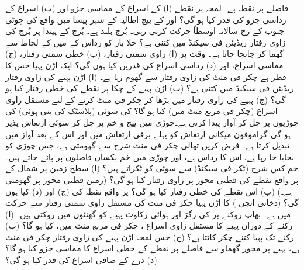  فاصلے پر  نقطہ ہے۔ لمحہ  پر  نقطے  (ا) کے اسراع کے مماسی جزو  اور (ب) اسراع کے رداسی جزو کی قدر کیا ہو گی؟
 اور  کے بیچ  اطالیہ   کے شہر  پیسا  میں واقع   کی چوٹی    جنوب کے رخ سالانہ  اوسطاً    حرکت کرتی رہی۔ بُرج  بلند ہے۔ بُرج کے پیندا پر  بُرج کی زاوی رفتار ریڈیئن فی سیکنڈ میں  کتنی  ہے؟ 
خلا باز  کو   رداس کے   میں  کے لحاظ سے گھما کر  جانچا جاتا ہے۔ وقت  پر (ا) زاوی سمتی رفتار، (ب) خطی سمتی رفتار، (ج) مماسی اسراع، اور (د) رداسی اسراع کی قدریں کیا ہوں گی؟
ایک اڑن پہیا جس کا قطر  ہے  چکر فی منٹ کی زاوی رفتار سے گھوم رہا ہے۔ (ا)  اڑن پہیے کی زاوی رفتار ریڈیئن فی سیکنڈ میں کتنی ہے؟ (ب) اڑن پہیے کے چکا پر نقطے کی خطی رفتار کیا ہو گی؟ (ج)  پہیے کی زاوی رفتار  میں بڑھا کر    چکر فی منٹ   کرنے کے لئے مستقل زاوی اسراع (چکر فی مربع  منٹ میں) کیا ہو گا؟
 کی سوئی    (پلاسٹک کی بنی ہوئی)  کی چوڑیوں  پر چل کر آواز پیدا کرتی ہے۔چوڑی میں  پیچ و خم  پر چل کر سوئی ارتعاش پذیر ہو گی۔گراموفون  میکانی  ارتعاش کو   پہلے     برقی ارتعاش میں اور اس کے بعد  آواز میں تبدیل کرتا ہے۔ فرض کریں تھالی  چکر فی منٹ  شرح سے گھومتی ہے، جس چوڑی کو بجایا جا رہا ہے، اس کا رداس  ہے، اور  چوڑی میں خم یکساں  فاصلوں پر پائے جاتے ہیں۔ خم کس شرح  (ٹکر فی سیکنڈ) سے سوئی کو ٹکراتے ہیں؟
(ا) سطح زمین پر     شمال کے  پر  واقع نقطے  کی  قطبی محور پر زاوی رفتار  کیا ہو گی؟ (زمین قطبی محور پر گھومتی ہے۔) (ب)   اس نقطے کی خطی رفتار  کیا ہو گی؟ پر واقع  نقطہ کی (ج)  اور (د)  کیا ہوں گی؟
 (دخانی انجن  ) کا اڑن پہیا   چکر فی منٹ کی مستقل زاوی سمتی رفتار سے حرکت میں ہے۔ بھاپ  روکنے  پر  کی   رگڑ اور ہوائی رکاوٹ پہیے کو   گھنٹوں میں روکتی ہیں۔ (ا)  رکنے کے دوران پہیے کا مستقل زاوی اسراع ، چکر فی مربع منٹ میں، کیا ہو گا؟ (ب)  رکنے تک پہیا کتنے چکر کاٹتا ہے؟ (ج)  جس لمحہ اڑن پہیے کی زاوی رفتار  چکر فی منٹ ہے، پہیے پر  محور گھماو سے  فاصلے پر نقطے  کے خطی  اسراع کا مماسی جزو  کیا ہو گا؟ (د)  ذرے کے صافی اسراع کی قدر کیا ہو گی؟
